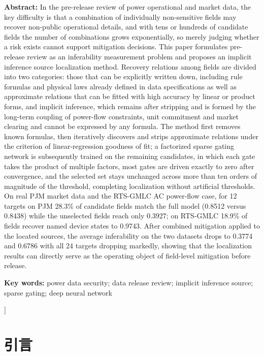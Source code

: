 \documentclass[UTF8,zihao=5,twoside]{ctexart}
\begin{document}
\noindent\textbf{Abstract:} In the pre-release review of power operational and market data, the key difficulty is that a combination of individually non-sensitive fields may recover non-public operational details, and with tens or hundreds of candidate fields the number of combinations grows exponentially, so merely judging whether a risk exists cannot support mitigation decisions. This paper formulates pre-release review as an inferability measurement problem and proposes an implicit inference source localization method. Recovery relations among fields are divided into two categories: those that can be explicitly written down, including rule formulas and physical laws already defined in data specifications as well as approximate relations that can be fitted with high accuracy by linear or product forms, and implicit inference, which remains after stripping and is formed by the long-term coupling of power-flow constraints, unit commitment and market clearing and cannot be expressed by any formula. The method first removes known formulas, then iteratively discovers and strips approximate relations under the criterion of linear-regression goodness of fit; a factorized sparse gating network is subsequently trained on the remaining candidates, in which each gate takes the product of multiple factors, most gates are driven exactly to zero after convergence, and the selected set stays unchanged across more than ten orders of magnitude of the threshold, completing localization without artificial thresholds. On real PJM market data and the RTS-GMLC AC power-flow case, for 12 targets on PJM 28.3\% of candidate fields match the full model (0.8512 versus 0.8438) while the unselected fields reach only 0.3927; on RTS-GMLC 18.9\% of fields recover named device states to 0.9743. After combined mitigation applied to the located sources, the average inferability on the two datasets drops to 0.3774 and 0.6786 with all 24 targets dropping markedly, showing that the localization results can directly serve as the operating object of field-level mitigation before release.\par
\noindent\textbf{Key words:} power data security; data release review; implicit inference source; sparse gating; deep neural network\par\vspace{0.8em}

\vspace{0.8em}
]

\section{引言}
\end{document}

